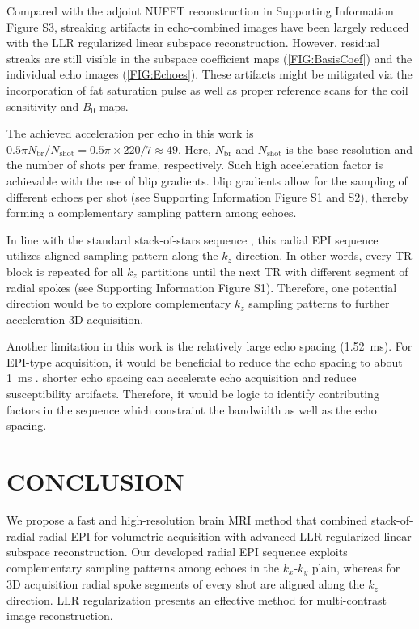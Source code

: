 \documentclass[a4paper,11pt]{article}
\begin{document}
Compared with the adjoint NUFFT reconstruction in Supporting Information Figure S3, 
streaking artifacts in echo-combined images have been 
largely reduced with the LLR regularized linear subspace reconstruction. 
However, residual streaks are still visible in 
the subspace coefficient maps (\cref{FIG:BasisCoef})
and the individual echo images (\cref{FIG:Echoes}). 
These artifacts might be mitigated via the incorporation of 
fat saturation pulse as well as proper reference scans 
for the coil sensitivity and $B_0$ maps.

The achieved acceleration per echo in this work 
is $0.5 \pi N_{\text{br}} / N_\text{shot} = 0.5\pi \times 220 / 7 \approx 49$. 
Here, $N_\text{br}$ and $N_\text{shot}$ is the base resolution and 
the number of shots per frame, respectively. 
Such high acceleration factor is achievable with the use of blip gradients. 
blip gradients allow for the sampling of different echoes per shot 
(see Supporting Information Figure S1 and S2), 
thereby forming a complementary sampling pattern among echoes. 

In line with the standard stack-of-stars sequence \cite{block_2014_rad}, 
this radial EPI sequence utilizes aligned sampling pattern along the $k_z$ direction. 
In other words, every TR block is repeated for all $k_z$ partitions 
until the next TR with different segment of radial spokes 
(see Supporting Information Figure S1). 
Therefore, one potential direction would be 
to explore complementary $k_z$ sampling patterns 
to further acceleration 3D acquisition.

Another limitation in this work is the relatively large echo spacing (\SI{1.52}{\ms}). 
For EPI-type acquisition, it would be beneficial to reduce the echo spacing to about 
\SI{1}{\ms} \cite{dong_2020_epti_sub}. 
shorter echo spacing can accelerate echo acquisition and reduce 
susceptibility artifacts. Therefore, it would be logic to identify 
contributing factors in the sequence which constraint the bandwidth 
as well as the echo spacing.


\section{CONCLUSION}

We propose a fast and high-resolution brain MRI method that 
combined stack-of-radial radial EPI for volumetric acquisition 
with advanced LLR regularized linear subspace reconstruction. 
Our developed radial EPI sequence exploits complementary sampling 
patterns among echoes in the $k_x$-$k_y$ plain, 
whereas for 3D acquisition radial spoke segments of every shot are 
aligned along the $k_z$ direction. 
LLR regularization presents an effective method for multi-contrast 
image reconstruction.
\end{document}
